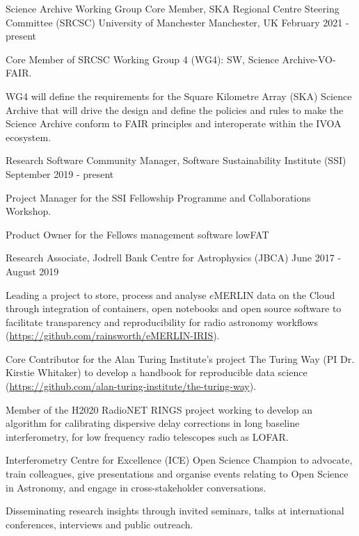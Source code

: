 \begin{cventries}
  \cventry
    {Science Archive Working Group Core Member, SKA Regional Centre Steering Committee (SRCSC)}
    {University of Manchester}
    {Manchester, UK}
    {February 2021 - present}
    {
      \begin{cvitems}
        \item {Core Member of SRCSC Working Group 4 (WG4): SW, Science Archive-VO-FAIR.}
        \item{WG4 will define the requirements for the Square Kilometre Array (SKA) Science Archive that will drive the design and define the policies and rules to make the Science Archive conform to FAIR principles and interoperate within the IVOA ecosystem.}
      \end{cvitems}
    }\vspace{-15pt}

  \cventry
    {Research Software Community Manager, Software Sustainability Institute (SSI)}
    {}
    {}
    {September 2019 - present}
    {
      \begin{cvitems}
        \item {Project Manager for the SSI Fellowship Programme and Collaborations Workshop.}
        \item{Product Owner for the Fellows management software lowFAT}
      \end{cvitems}
    }\vspace{-15pt}

  \cventry
    {Research Associate, Jodrell Bank Centre for Astrophysics (JBCA)}
    {}
    {}
    {June 2017 - August 2019}
    {
      \begin{cvitems}
        \item {Leading a project to store, process and analyse $e$MERLIN data on the Cloud through integration of containers, open notebooks and open source software to facilitate transparency and reproducibility for radio astronomy workflows (\url{https://github.com/rainsworth/eMERLIN-IRIS}).}
        \item {Core Contributor for the Alan Turing Institute's project The Turing Way (PI Dr. Kirstie Whitaker) to develop a handbook for reproducible data science (\url{https://github.com/alan-turing-institute/the-turing-way}).}
        \item {Member of the H2020 RadioNET RINGS project working to develop an algorithm for calibrating dispersive delay corrections in long baseline interferometry, for low frequency radio telescopes such as LOFAR.}
        \item {Interferometry Centre for Excellence (ICE) Open Science Champion to advocate, train colleagues, give presentations and organise events relating to Open Science in Astronomy, and engage in cross-stakeholder conversations.}
        \item {Disseminating research insights through invited seminars, talks at international conferences, interviews and public outreach.}
      \end{cvitems}
    }\vspace{-6pt}


\end{cventries}
